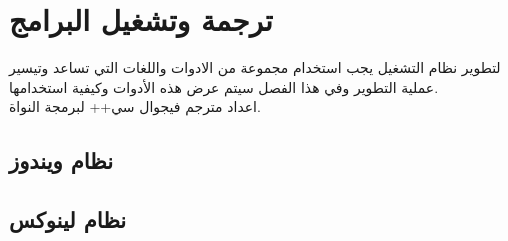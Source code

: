 \documentclass[document.tex]{subfiles}
\begin{document}
\appendix
\chapter{ترجمة وتشغيل البرامج}
\label{apx:compile_link}

لتطوير نظام التشغيل يجب استخدام مجموعة من الادوات واللغات التي تساعد وتيسير عملية التطوير وفي هذا الفصل سيتم عرض هذه الأدوات وكيفية استخدامها.\\

اعداد مترجم فيجوال سي++ لبرمجة النواة.
\section{نظام ويندوز}
\section{نظام لينوكس}
\end{document}
